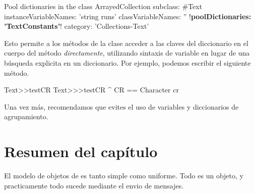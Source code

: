 \documentclass[a4paper,10pt,twoside]{book}
\begin{document}

\begin{classdef}[textpooldict]{Pool dictionaries in the  class}
ArrayedCollection subclass: #Text
        instanceVariableNames: 'string runs' 	
        classVariableNames: '' 	
        !\textbf{poolDictionaries: 'TextConstants'}!
        category: 'Collections-Text'
\end{classdef}
   
Esto permite a los m\'etodos de la clase  acceder a las claves del diccionario en el cuerpo del m\'etodo \emph{directamente}, \ie utilizando sintaxis de variable en lugar de una b\'usqueda explicita en un diccionario.
Por ejemplo, podemos escribir el siguiente m\'etodo.
  
\begin{method}[texttestcr]{Text>>testCR}
Text>>>testCR 	
      ^ CR == Character cr
\end{method}

Una vez m\'as, recomendamos que evites el uso de variables y diccionarios de agrupamiento.

\section{Resumen del cap\'itulo}

El modelo de objetos de \pharo es tanto simple como uniforme.
Todo es un objeto, y practicamente todo sucede mediante el envio de mensajes.
\end{document}
